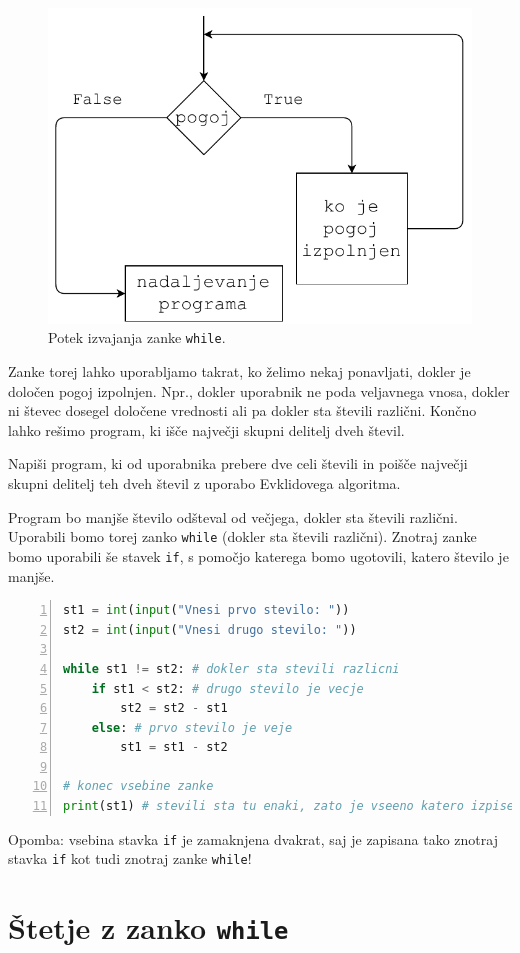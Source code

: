 \begin{figure}
    \centering
    \includegraphics[width=0.5\linewidth]{img/while1.pdf}
    \caption{Potek izvajanja zanke \texttt{while}.}
    \label{img:while1}
\end{figure}

Zanke torej lahko uporabljamo takrat, ko želimo nekaj ponavljati, dokler je določen pogoj izpolnjen. Npr., dokler uporabnik ne poda veljavnega vnosa, dokler ni števec dosegel določene vrednosti ali pa dokler sta števili različni. Končno lahko rešimo program, ki išče največji skupni delitelj dveh števil.
\begin{zgled}
Napiši program, ki od uporabnika prebere dve celi števili in poišče največji skupni delitelj teh dveh števil z uporabo Evklidovega algoritma.
\end{zgled}
\begin{resitev}
Program bo manjše število odšteval od večjega, dokler sta števili različni. Uporabili bomo torej zanko \texttt{while} (dokler sta števili različni).  Znotraj zanke bomo uporabili še stavek \texttt{if}, s pomočjo katerega bomo ugotovili, katero število je manjše. 
\begin{lstlisting}[language=Python, showstringspaces=false,numbers=left]
st1 = int(input("Vnesi prvo stevilo: "))
st2 = int(input("Vnesi drugo stevilo: "))

while st1 != st2: # dokler sta stevili razlicni
    if st1 < st2: # drugo stevilo je vecje
        st2 = st2 - st1
    else: # prvo stevilo je veje
        st1 = st1 - st2

# konec vsebine zanke 
print(st1) # stevili sta tu enaki, zato je vseeno katero izpisem
\end{lstlisting}
Opomba: vsebina stavka \texttt{if} je zamaknjena dvakrat, saj je zapisana tako znotraj stavka \texttt{if} kot tudi znotraj zanke \texttt{while}!
\end{resitev}

\section{Štetje z zanko \texttt{while}}

